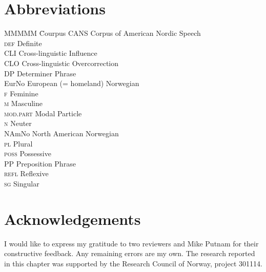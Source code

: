 \documentclass[output=paper,colorlinks,citecolor=brown]{langscibook}
\begin{document}
\section*{Abbreviations}
\begin{tabbing}
MMMMM \= Courpus\kill
CANS \> Corpus of American Nordic Speech\\
\textsc{def} \> Definite\\
CLI \> Cross-linguistic Influence \\
CLO \> Cross-linguistic Overcorrection\\
DP \> Determiner Phrase \\
EurNo \> European (= homeland) Norwegian\\
\textsc{f} \> Feminine \\
\textsc{m} \> Masculine \\
\textsc{mod.part} \> Modal Particle\\
\textsc{n} \> Neuter\\
NAmNo \> North American Norwegian \\
\textsc{pl} \> Plural\\
\textsc{poss} \> Possessive \\
PP \> Preposition Phrase\\
\textsc{refl} \> Reflexive\\
\textsc{sg} \> Singular
\end{tabbing}

\section*{Acknowledgements}
I would like to express my gratitude to two reviewers and Mike Putnam for their constructive feedback.  Any remaining errors are my own.
 The research reported in this chapter was supported by the Research Council of Norway, project 301114.  
\printbibliography[heading=subbibliography,notkeyword=this]
\end{document}
